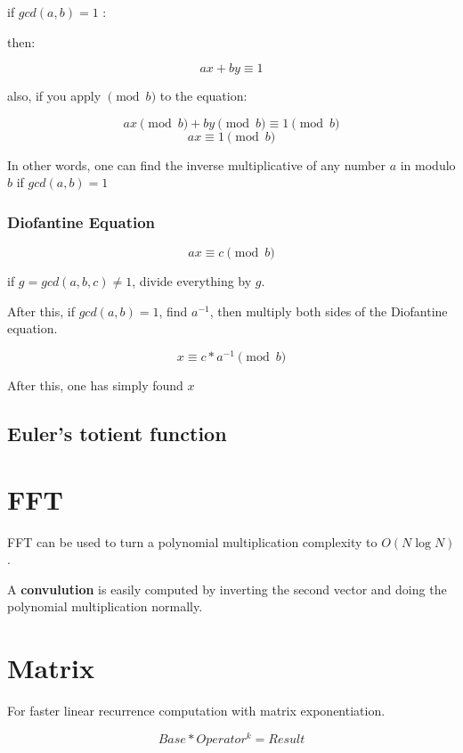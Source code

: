 	if \textbf{ $gcd(a, b) = 1$ }:

	then:

	$$ax + by \equiv 1$$

	also, if you apply $\pmod{b}$ to the equation:

	$$ ax \pmod{b} + by \pmod{b} \equiv 1 \pmod{b} $$
	$$ ax \equiv 1 \pmod{b} $$

	In other words, one can find the inverse multiplicative of any number $a$ in modulo $b$ if $gcd(a, b) = 1$

	\subsubsection{Diofantine Equation}

	$$ ax \equiv c \pmod{b} $$

	if $g = gcd({a, b, c}) \neq 1$, divide everything by $g$.

	After this, if $gcd(a, b) = 1$, find $a^{-1}$, then multiply both sides of the Diofantine equation.

	$$ x \equiv c * a^{-1} \pmod{b} $$

	After this, one has simply found $x$


\subsection{Euler's totient function}


\section{FFT}

	FFT can be used to turn a polynomial multiplication complexity to $O(N \log{N})$.

	A \textbf{convulution} is easily computed by inverting the second vector and doing the polynomial multiplication normally.


\section{Matrix}

For faster linear recurrence computation with matrix exponentiation. 

$$ Base * Operator^{k} = Result $$

